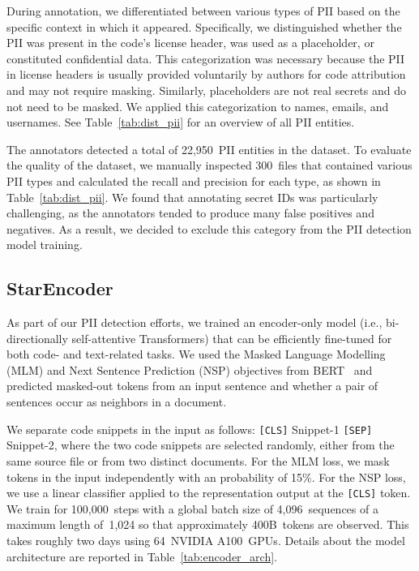 During annotation, we differentiated between various types of PII based on the specific context in which it appeared. Specifically, we distinguished whether the PII was present in the code's license header, was used as a placeholder, or constituted confidential data. This categorization was necessary because the PII in license headers is usually provided voluntarily by authors for code attribution and may not require masking. Similarly, placeholders are not real secrets and do not need to be masked. We applied this categorization to names, emails, and usernames. See Table~\ref{tab:dist_pii} for an overview of all PII entities. 

The annotators detected a total of 22,950~PII entities in the dataset. To evaluate the quality of the dataset, we manually inspected 300~files that contained various PII types and calculated the recall and precision for each type, as shown in Table~\ref{tab:dist_pii}. We found that annotating secret IDs was particularly challenging, as the annotators tended to produce many false positives and negatives. As a result, we decided to exclude this category from the PII detection model training.

\subsection{StarEncoder}\label{sec:bigcode_encoder}
As part of our PII detection efforts, we trained an encoder-only model (i.e., bi-directionally self-attentive Transformers) that can be efficiently fine-tuned for both code- and text-related tasks. We used the Masked Language Modelling (MLM) and Next Sentence Prediction (NSP) objectives from BERT~\citep{devlin2018bert,liu2019roberta} and predicted masked-out tokens from an input sentence and whether a pair of sentences occur as neighbors in a document. 

We separate code snippets in the input as follows: \texttt{[CLS]} Snippet-1 \texttt{[SEP]} Snippet-2, where the two code snippets are selected randomly, either from the same source file or from two distinct documents. For the MLM loss, we mask tokens in the input independently with an probability of 15\%. For the NSP loss, we use a linear classifier applied to the representation output at the \texttt{[CLS]} token. We train for 100,000~steps with a global batch size of 4,096~sequences of a maximum length of~1,024 so that approximately 400B~tokens are observed. This takes roughly two days using 64~NVIDIA A100~GPUs. Details about the model architecture are reported in Table~\ref{tab:encoder_arch}. 

